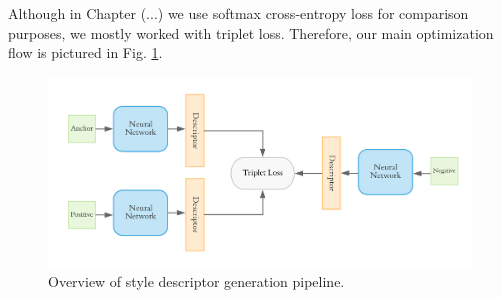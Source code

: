 Although in Chapter (...) we use softmax cross-entropy loss for comparison purposes, we mostly worked with triplet loss.  Therefore, our main optimization flow is pictured in Fig. \ref{fig:triplet_overall}.

\begin{figure}[hbpt]
	\centering
	\includegraphics[width=\linewidth]{imgs/triplet_loss_architecture.pdf}
	\caption{Overview of style descriptor generation pipeline.}
	\label{fig:triplet_overall}
\end{figure}